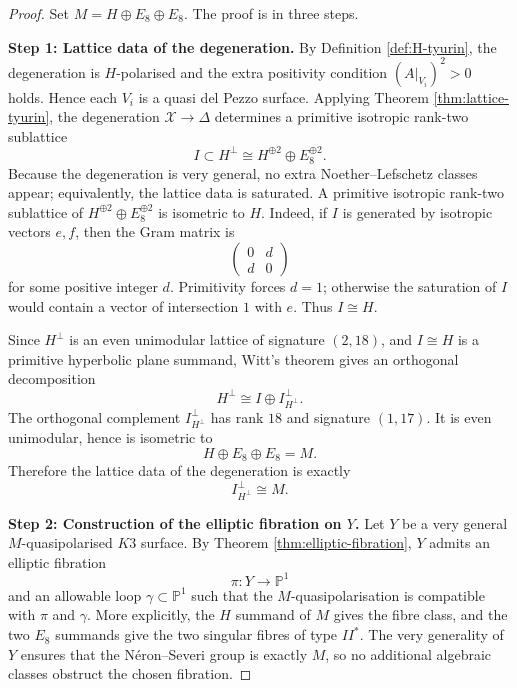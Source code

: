 \documentclass[11pt]{amsart}
\theoremstyle{definition}
\theoremstyle{remark}
\begin{document}
\begin{proof}
Set \(M=H\oplus E_8\oplus E_8\).  The proof is in three steps.

\medskip
\noindent\textbf{Step 1: Lattice data of the degeneration.}
By Definition \ref{def:H-tyurin}, the degeneration is \(H\)-polarised and the
extra positivity condition \((A|_{V_i})^2>0\) holds.  Hence each \(V_i\) is a
quasi del Pezzo surface.  Applying Theorem \ref{thm:lattice-tyurin}, the
degeneration \(\mathcal X\to\Delta\) determines a primitive isotropic rank-two
sublattice
\[
I\subset H^\perp\cong H^{\oplus 2}\oplus E_8^{\oplus 2}.
\]
Because the degeneration is very general, no extra Noether--Lefschetz classes
appear; equivalently, the lattice data is saturated.  A primitive isotropic
rank-two sublattice of \(H^{\oplus 2}\oplus E_8^{\oplus 2}\) is isometric to
\(H\).  Indeed, if \(I\) is generated by isotropic vectors \(e,f\), then the
Gram matrix is
\[
\begin{pmatrix}0&d\\ d&0\end{pmatrix}
\]
for some positive integer \(d\).  Primitivity forces \(d=1\); otherwise the
saturation of \(I\) would contain a vector of intersection \(1\) with \(e\).
Thus \(I\cong H\).

Since \(H^\perp\) is an even unimodular lattice of signature \((2,18)\), and
\(I\cong H\) is a primitive hyperbolic plane summand, Witt's theorem gives an
orthogonal decomposition
\[
H^\perp\cong I\oplus I^\perp_{H^\perp}.
\]
The orthogonal complement \(I^\perp_{H^\perp}\) has rank \(18\) and signature
\((1,17)\).  It is even unimodular, hence is isometric to
\[
H\oplus E_8\oplus E_8=M.
\]
Therefore the lattice data of the degeneration is exactly
\[
I^\perp_{H^\perp}\cong M.
\]

\medskip
\noindent\textbf{Step 2: Construction of the elliptic fibration on \(Y\).}
Let \(Y\) be a very general \(M\)-quasipolarised \(K3\) surface.  By
Theorem \ref{thm:elliptic-fibration}, \(Y\) admits an elliptic fibration
\[
\pi\colon Y\to \mathbb P^1
\]
and an allowable loop \(\gamma\subset \mathbb P^1\) such that the
\(M\)-quasipolarisation is compatible with \(\pi\) and \(\gamma\).  More
explicitly, the \(H\) summand of \(M\) gives the fibre class, and the two
\(E_8\) summands give the two singular fibres of type \(II^*\).  The very
generality of \(Y\) ensures that the Néron--Severi group is exactly \(M\), so no
additional algebraic classes obstruct the chosen fibration.


\end{proof}
\end{document}
